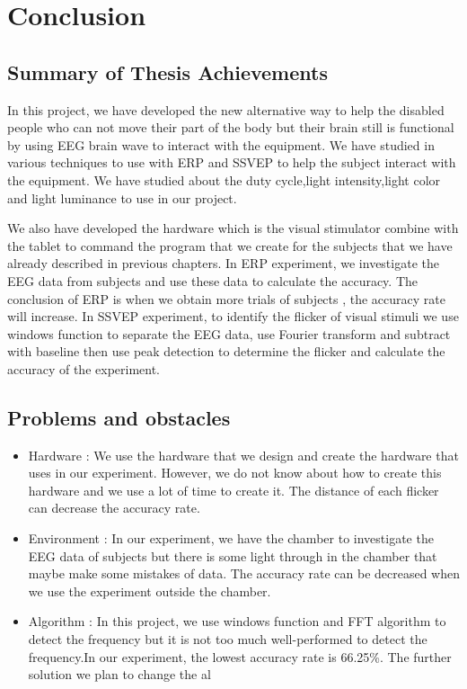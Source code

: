 \chapter{Conclusion}

\label{ch:conclusions}

\section{Summary of Thesis Achievements}

\hspace{1.5cm}
In this project, we have developed the new alternative way to help the disabled people who can not move their part of the body but their brain still is functional by using EEG brain wave to interact with the equipment. We have studied in various techniques to use with ERP and SSVEP to help the subject interact with the equipment. We have studied about the duty cycle,light intensity,light color and light luminance to use in our project.\par
We also have developed the hardware which is the visual stimulator combine with the tablet to command the program that we create for the subjects that we have already described in previous chapters. In ERP experiment, we investigate the EEG data from subjects and use these data to calculate the accuracy. The conclusion of ERP is when we obtain more trials of subjects , the accuracy rate will increase. In SSVEP experiment, to identify the flicker of visual stimuli we use windows function to separate the EEG data, use Fourier transform and subtract with baseline then use peak detection to determine the flicker and calculate the accuracy of the experiment.

\newpage
\section{Problems and obstacles}
\begin{itemize}
\item Hardware : We use the hardware that we design and create the hardware that uses in our experiment. However, we do not know about how to create this hardware and we use a lot of time to create it. The distance of each flicker can decrease the accuracy rate.

\item Environment : In our experiment, we have the chamber to investigate the EEG data of subjects but there is some light through in the chamber that maybe make some mistakes of data. The accuracy rate can be decreased when we use the experiment outside the chamber.

\item Algorithm : In this project, we use windows function and FFT algorithm to detect the frequency but it is not too much well-performed to detect the frequency.In our experiment, the lowest accuracy rate is 66.25\%. The further solution we plan to change the al
\end{itemize}